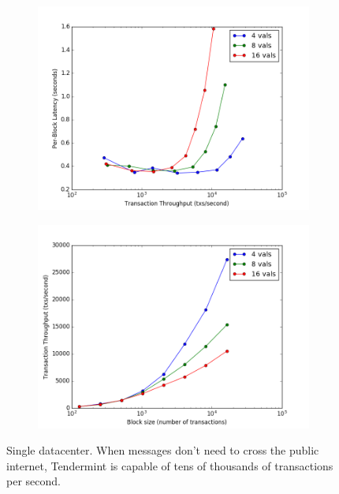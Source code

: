 \begin{figure}[]
	\centering
	\begin{subfigure}{0.8 \textwidth}
		\includegraphics[width=\linewidth,height=\textheight,keepaspectratio]{figures/throughput/single_datacenter/latency-throughput.png}
		\centering
	\end{subfigure}

	\begin{subfigure}{0.8 \textwidth}
		\includegraphics[width=\linewidth,height=\textheight,keepaspectratio]{figures/throughput/single_datacenter/throughput-blocksize.png}
	\end{subfigure}
	\caption[Latency-throughput tradeoff in non-faulty local network]{Single datacenter.
When messages don't need to cross the public internet, Tendermint is capable of tens of thousands of transactions per second.}
	\label{fig:exp:throughput:single}
\end{figure}



